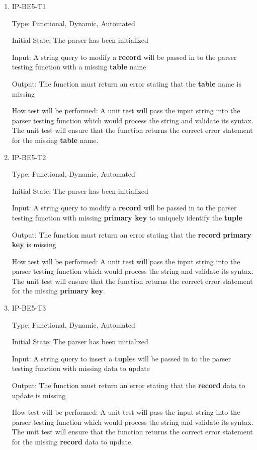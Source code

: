 \documentclass[12pt, titlepage]{article}
\begin{document}
\begin{enumerate}
\item{IP-BE5-T1}

Type: Functional, Dynamic, Automated
					
Initial State: The parser has been initialized
					
Input: A string query to modify a \textbf{record} will be passed in to the parser testing function with a missing \textbf{table} name
					
Output: The function must return an error stating that the \textbf{table} name is missing
					
How test will be performed: A unit test will pass the input string into the parser testing function which would process the string and validate its syntax. The unit test will ensure that the function returns the correct error statement for the missing \textbf{table} name.

\item{IP-BE5-T2}

Type: Functional, Dynamic, Automated
					
Initial State: The parser has been initialized
					
Input: A string query to modify a \textbf{record} will be passed in to the parser testing function with missing \textbf{primary key} to uniquely identify the \textbf{tuple}
					
Output: The function must return an error stating that the \textbf{record} \textbf{primary key} is missing
					
How test will be performed: A unit test will pass the input string into the parser testing function which would process the string and validate its syntax. The unit test will ensure that the function returns the correct error statement for the missing \textbf{primary key}.

\item{IP-BE5-T3}

Type: Functional, Dynamic, Automated
					
Initial State: The parser has been initialized
					
Input: A string query to insert a \textbf{tuple}s will be passed in to the parser testing function with missing data to update
					
Output: The function must return an error stating that the \textbf{record} data to update is missing
					
How test will be performed: A unit test will pass the input string into the parser testing function which would process the string and validate its syntax. The unit test will ensure that the function returns the correct error statement for the missing \textbf{record} data to update.


\end{enumerate}
\end{document}
